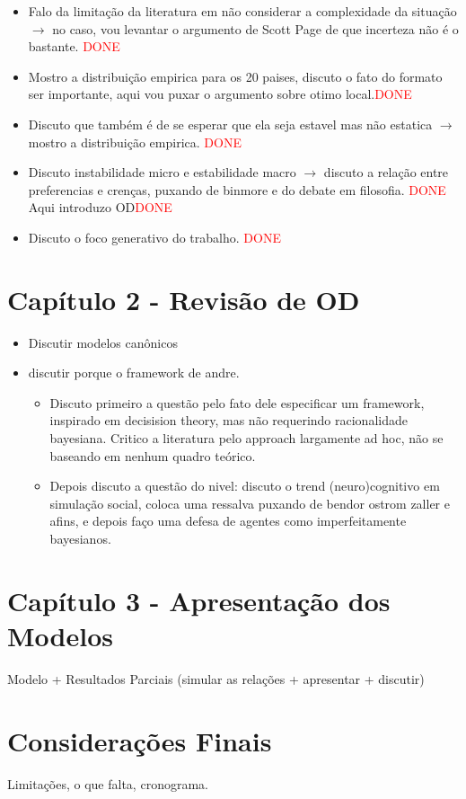 \documentclass{article}
\begin{document}
\begin{itemize}
\item Falo da limitação da literatura em não considerar a complexidade da
  situação $\rightarrow$ no caso, vou levantar o argumento de Scott Page de que incerteza
  não é o bastante. \textcolor{red}{DONE}
\item Mostro a distribuição empirica para os 20 paises, discuto o fato do
  formato ser importante, aqui vou puxar o argumento sobre otimo local.\textcolor{red}{DONE}
\item Discuto que também é de se esperar que ela seja estavel mas não estatica
  $\rightarrow$ mostro a distribuição empirica. \textcolor{red}{DONE}
\item Discuto instabilidade micro e estabilidade macro $\rightarrow$ discuto a relação
  entre preferencias e crenças, puxando de binmore e do debate em filosofia. \textcolor{red}{DONE}
  Aqui introduzo OD\textcolor{red}{DONE}
\item Discuto o foco generativo do trabalho. \textcolor{red}{DONE}
\end{itemize}


\section*{Capítulo 2 - Revisão de OD }

\begin{itemize}
\item Discutir modelos canônicos
\item  discutir porque o framework de andre.
  \begin{itemize}
  \item Discuto primeiro a questão pelo fato dele especificar um framework,
    inspirado em decisision theory, mas não requerindo racionalidade bayesiana.
    Critico a literatura pelo approach largamente ad hoc, não se baseando em
    nenhum quadro teórico.
  \item Depois discuto a questão do nivel: discuto o trend (neuro)cognitivo em
    simulação social, coloca uma ressalva puxando de bendor ostrom zaller e
    afins, e depois faço uma defesa de agentes como imperfeitamente bayesianos.
  \end{itemize}
\end{itemize}


\section*{Capítulo 3 - Apresentação dos Modelos}

Modelo + Resultados Parciais (simular as relações + apresentar + discutir)




\section*{Considerações Finais}

Limitações, o que falta, cronograma.
\end{document}
